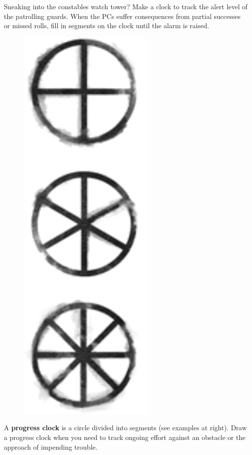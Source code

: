 \begin{qb}Sneaking into the constables watch tower? Make a clock to track the alert level of the patrolling guards. When the PCs suffer consequences from partial successes or missed rolls, fill in segments on the clock until the alarm is raised.\end{qb}

\begin{figure}\begin{center}\includegraphics[scale=0.2]{img/progress-clocks.png}\end{center}\end{figure}

A \textbf{progress clock} is a circle divided into segments (see examples at right). Draw a progress clock when you need to track ongoing effort against an obstacle or the approach of impending trouble.


